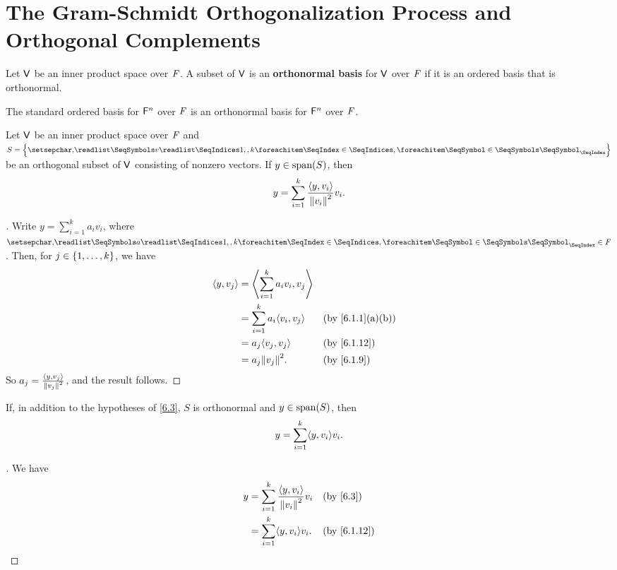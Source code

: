 \section{The Gram-Schmidt Orthogonalization Process and Orthogonal Complements}\label{sec:6.2}

\begin{defn}\label{6.2.1}
  Let \(\mathsf{V}\) be an inner product space over \(\mathit{F}\).
  A subset of \(\mathsf{V}\) is an \textbf{orthonormal basis} for \(\mathsf{V}\) over \(\mathit{F}\) if it is an ordered basis that is orthonormal.
\end{defn}

\begin{eg}\label{6.2.2}
  The standard ordered basis for \(\mathsf{F}^n\) over \(\mathit{F}\) is an orthonormal basis for \(\mathsf{F}^n\) over \(\mathit{F}\).
\end{eg}

\begin{thm}\label{6.3}
  Let \(\mathsf{V}\) be an inner product space over \(\mathit{F}\) and \(S = \set{\seq{v}{1,,k}}\) be an orthogonal subset of \(\mathsf{V}\) consisting of nonzero vectors.
  If \(y \in \spn{S}\), then
  \[
    y = \sum_{i = 1}^k \frac{\left\langle y, v_i\right\rangle}{\left\lVert v_i\right\rVert^2} v_i.
  \]
\end{thm}

\begin{proof}[]
  Write \(y = \sum_{i = 1}^k a_i v_i\), where \(\seq{a}{1,,k} \in \F\).
  Then, for \(j \in \left\lbrace1, \dots, k\right\rbrace\), we have
  \begin{align*}
    \inn{y, v_j} & = \inn{\sum_{i = 1}^k a_i v_i, v_j}                                     \\
                 & = \sum_{i = 1}^k a_i \inn{v_i, v_j} &  & \text{(by \cref{6.1.1}(a)(b))} \\
                 & = a_j \inn{v_j, v_j}                &  & \text{(by \cref{6.1.12})}      \\
                 & = a_j \norm{v_j}^2.                 &  & \text{(by \cref{6.1.9})}
  \end{align*}
  So \(a_j = \frac{\left\langle y, v_j\right\rangle}{\left\lVert v_j\right\rVert^2}\), and the result follows.
\end{proof}

\begin{cor}\label{6.2.3}
  If, in addition to the hypotheses of \cref{6.3}, \(S\) is orthonormal and \(y \in \spn{S}\), then
  \[
    y = \sum_{i = 1}^k \inn{y, v_i} v_i.
  \]
\end{cor}

\begin{proof}[]
  We have
  \begin{align*}
    y & = \sum_{i = 1}^k \frac{\inn{y, v_i}}{\norm{v_i}^2} v_i &  & \text{(by \cref{6.3})}    \\
      & = \sum_{i = 1}^k \inn{y, v_i} v_i.                     &  & \text{(by \cref{6.1.12})}
  \end{align*}
\end{proof}

